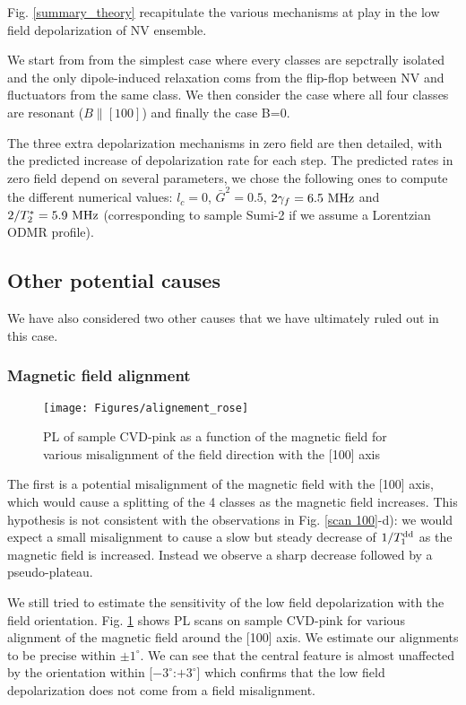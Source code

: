 \documentclass[a4paper,11pt]{report}
\begin{document}
Fig. \ref{summary_theory} recapitulate the various mechanisms at play in the low field depolarization of NV ensemble. 

We start from from the simplest case where every classes are sepctrally isolated and the only dipole-induced relaxation coms from the flip-flop between NV and fluctuators from the same class. We then consider the case where all four classes are resonant ($B\parallel [100]$) and finally the case B=0.

The three extra depolarization mechanisms in zero field are then detailed, with the predicted increase of depolarization rate for each step. The predicted rates in zero field depend on several parameters, we chose the following ones to compute the different numerical values: $l_c=0$, $\bar{G}^2=0.5$, $2\gamma_f = 6.5\ \rm MHz$ and $2/T_2^*=5.9\ \rm MHz$ (corresponding to sample Sumi-2 if we assume a Lorentzian ODMR profile).

\subsection{Other potential causes}
We have also considered two other causes that we have ultimately ruled out in this case.

\subsubsection{Magnetic field alignment}
\begin{figure}[h]
\centering
\texttt{[image: Figures/alignement\_rose]}
\caption{PL of sample CVD-pink as a function of the magnetic field for various misalignment of the field direction with the [100] axis}
\label{alignement rose}
\end{figure}

The first is a potential misalignment of the magnetic field with the [100] axis, which would cause a splitting of the 4 classes as the magnetic field increases. This hypothesis is not consistent with the observations in Fig. \ref{scan 100}-d): we would expect a small  misalignment to cause a slow but steady decrease of $1/T_1^{\rm dd}$ as the magnetic field is increased. Instead we observe a sharp decrease followed by a pseudo-plateau.

We still tried to estimate the sensitivity of the low field depolarization with the field orientation. Fig. \ref{alignement rose} shows PL scans on sample CVD-pink for various alignment of the magnetic field around the [100] axis. We estimate our alignments to be precise within $\pm 1^\circ$. We can see that the central feature is almost unaffected by the orientation within [$-3^\circ$:$+3^\circ$] which confirms that the low field depolarization does not come from a field misalignment.
\end{document}
